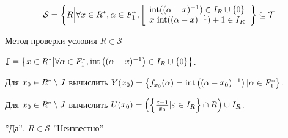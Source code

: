 \documentclass[8pt, xcolor=x11names]{beamer}
\begin{document}
\begin{frame}
    \begin{block}{\vspace*{-3ex}}
        $$
        \mathcal{S} = \left\{
            R \Big| \forall x \in R^{*}, \alpha \in F_{1}^{*}, \left[
                \begin{array}{l}
                    \textrm{int}((\alpha-x)^{-1}) \in I_{R}\cup\{0\}\\
                    x \ \textrm{int}((\alpha-x)^{-1})+1 \in I_{R}
                \end{array}
            \right.
        \right\} \subseteq \mathcal{T}
        $$
    \end{block}

    \begin{block}{Метод проверки условия $R \in \mathcal{S}$}
        \begin{algorithmic}[1]
            \State $\mathbb{J} = \left\{
                x \in R^{*} \big| \forall \alpha \in F_1^{*}, \textrm{int}\left((\alpha - x)^{-1}\right) \in I_{R} \cup \{0\}
            \right\}$.
    
            \State Для $x_0 \in R^{*} \setminus J$ вычислить $Y(x_0) = \left\{
                f_{x_0}(\alpha) = \textrm{int}\left((\alpha - x_0)^{-1}\right) | \alpha \in F_1^{*}
            \right\}$.
    
            \State Для $x_0 \in R^{*} \setminus J$ вычислить $U(x_0) = \left(
                \left\{
                    \frac{\varepsilon - 1}{x_0} | \varepsilon \in I_{R}
                \right\} \cap R
            \right) \cup I_{R}$.
    
                \State\Return ''Да'', $R \in \mathcal{S}$
            \Else
                \State\Return ''Неизвестно''
            \EndIf
        \end{algorithmic}
    \end{block}
\end{frame}
\end{document}
